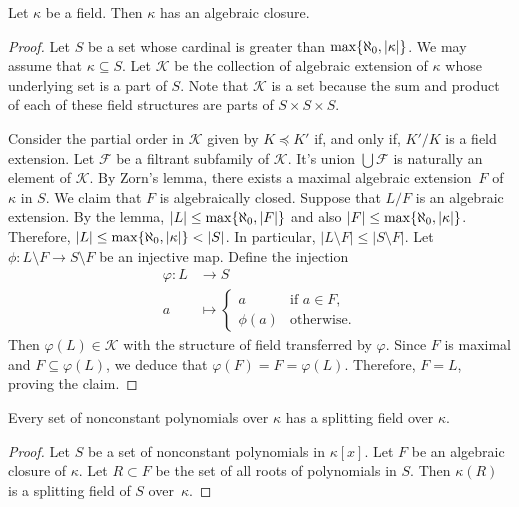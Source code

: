 \begin{thm}
    Let\/ $\kappa$ be a field. Then\/ $\kappa$ has an algebraic closure. 
\end{thm}

\begin{proof}
    Let $S$ be a set whose cardinal is greater than $\max\{\aleph_0,|\kappa|\}$. We may assume that $\kappa\subseteq S$. Let $\mathcal K$ be the collection of algebraic extension of $\kappa$ whose underlying set is a part of $S$. Note that $\mathcal K$ is a set because the sum and product of each of these field structures are parts of $S\times S\times S$.

    Consider the partial order in $\mathcal K$ given by $K\preceq K'$ if, and only if, $K'/K$ is a field extension. Let $\mathcal F$ be a filtrant subfamily of $\mathcal K$. It's union $\bigcup\mathcal F$ is naturally an element of $\mathcal K$. By Zorn's lemma, there exists a maximal algebraic extension~$F$ of~$\kappa$ in $S$. We claim that $F$ is algebraically closed. Suppose that $L/F$ is an algebraic extension. By the lemma, $|L|\le\max\{\aleph_0,|F|\}$ and also $|F|\le\max\{\aleph_0,|\kappa|\}$. Therefore, $|L|\le\max\set{\aleph_0,|\kappa|}<|S|$. In particular, $|L\setminus F|\le|S\setminus F|$. Let $\phi\colon L\setminus F\to S\setminus F$ be an injective map. Define the injection
    \begin{align*}
        \varphi\colon L&\to S\\
        a&\mapsto\begin{cases}
            a   &\text{if }a\in F,\\
            \phi(a) &\text{otherwise}.
        \end{cases}
    \end{align*}
    Then $\varphi(L)\in\mathcal K$ with the structure of field transferred by $\varphi$. Since $F$ is maximal and $F\subseteq\varphi(L)$, we deduce that $\varphi(F)=F=\varphi(L)$. Therefore, $F=L$, proving the claim.
\end{proof}

\begin{cor}
    Every set of nonconstant polynomials over\/ $\kappa$ has a splitting field over\/ $\kappa$. 
\end{cor}

\begin{proof}
    Let $S$ be a set of nonconstant polynomials in $\kappa[x]$. Let $F$ be an algebraic closure of $\kappa$. Let $R\subset F$ be the set of all roots of polynomials in $S$. Then $\kappa(R)$ is a splitting field of $S$ over~$\kappa$.
\end{proof}

